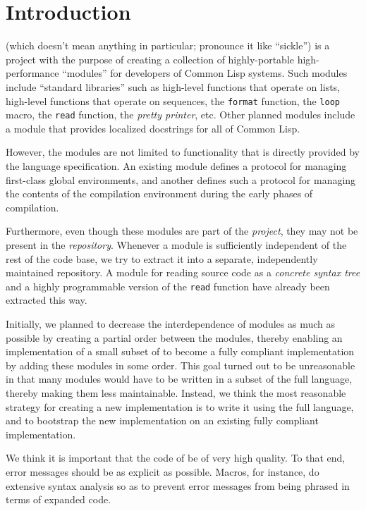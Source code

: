 
\chapter{Introduction}
%

\sysname{} (which doesn't mean anything in particular; pronounce it
like ``sickle'') is a project with the purpose of creating a
collection of highly-portable high-performance ``modules'' for
developers of Common Lisp systems.  Such modules include ``standard
libraries'' such as high-level functions that operate on lists,
high-level functions that operate on sequences, the \texttt{format}
function, the \texttt{loop} macro, the \texttt{read} function, the
\emph{pretty printer}, etc.  Other planned modules include a module
that provides localized docstrings for all of Common Lisp.

However, the modules are not limited to functionality that is directly
provided by the \commonlisp{} language specification.  An existing
module defines a \clos{} protocol for managing first-class global
environments, and another defines such a protocol for managing
the contents of the compilation environment during the early phases of
compilation.

Furthermore, even though these modules are part of the \sysname{}
\emph{project}, they may not be present in the \sysname{}
\emph{repository}.  Whenever a module is sufficiently independent of
the rest of the \sysname{} code base, we try to extract it into a
separate, independently maintained repository.  A module for reading
\commonlisp{} source code as a \emph{concrete syntax tree} and a
highly programmable version of the \commonlisp{} \texttt{read}
function have already been extracted this way.

Initially, we planned to decrease the interdependence of modules as
much as possible by creating a partial order between the modules,
thereby enabling an implementation of a small subset of \commonlisp{}
to become a fully compliant implementation by adding these modules in
some order.  This goal turned out to be unreasonable in that many
modules would have to be written in a subset of the full language,
thereby making them less maintainable.  Instead, we think the most
reasonable strategy for creating a new \commonlisp{} implementation is
to write it using the full language, and to bootstrap the new
implementation on an existing fully compliant implementation.

We think it is important that the code of
\sysname{} be of very high quality.  To that end, error messages
should be as explicit as possible.  Macros, for instance, do extensive
syntax analysis so as to prevent error messages from being phrased in
terms of expanded code.

